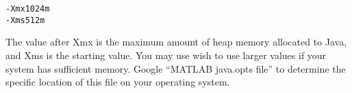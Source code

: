 \begin{lstlisting}
-Xmx1024m
-Xms512m
\end{lstlisting}

The value after Xmx is the maximum amount of heap memory allocated to Java, and Xms is the starting value.  You may use wish to use larger values if your system has sufficient memory.  Google ``MATLAB java.opts file'' to determine the specific location of this file on your operating system.

\fi


